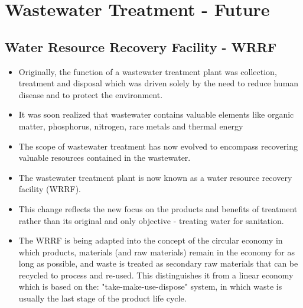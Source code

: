 \chapter{Wastewater Treatment - Future}

\section{Water Resource Recovery Facility - WRRF}
\begin{itemize}
\item Originally, the function of a wastewater treatment plant was collection, treatment and disposal which was driven solely by the need to reduce human disease and to protect the environment.
\item It was soon realized that wastewater contains valuable elements like organic matter, phosphorus, nitrogen, rare metals and thermal energy
\item The scope of wastewater treatment has now evolved to encompass recovering valuable resources contained in the wastewater.
\item The wastewater treatment plant is now known as a water resource recovery facility (WRRF). 
\item This change reflects the new focus on the products and benefits of treatment rather than its original and only objective - treating water for sanitation.
\item The WRRF is being adapted into the concept of the circular economy in which products, materials (and raw materials) remain in the economy for as long as possible, and waste is treated as secondary raw materials that can be recycled to process and re-used.  This distinguishes it from a linear economy which is based on the: "take-make-use-dispose" system, in which waste is usually the last stage of the product life cycle.

\end{itemize}

